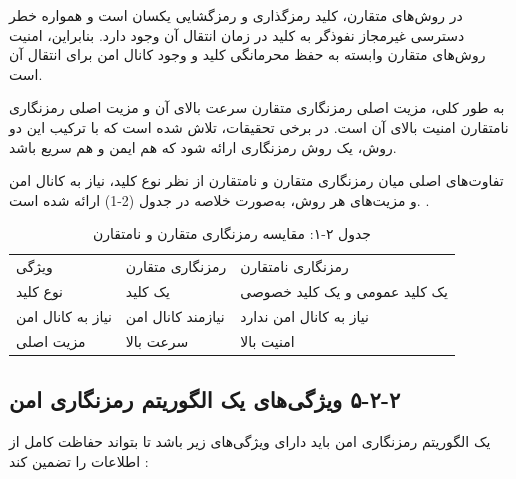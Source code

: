 در روش‌های متقارن، کلید رمزگذاری و رمزگشایی یکسان است و همواره خطر دسترسی غیرمجاز نفوذگر به کلید در زمان انتقال آن وجود دارد. بنابراین، امنیت روش‌های متقارن وابسته به حفظ محرمانگی کلید و وجود کانال امن برای انتقال آن است.

به طور کلی، مزیت اصلی رمزنگاری متقارن سرعت بالای آن و مزیت اصلی رمزنگاری نامتقارن امنیت بالای آن است. در برخی تحقیقات، تلاش شده است که با ترکیب این دو روش، یک روش رمزنگاری ارائه شود که هم ایمن و هم سریع باشد\cite{ref29}.

تفاوت‌های اصلی میان رمزنگاری متقارن و نامتقارن از نظر نوع کلید، نیاز به کانال امن و مزیت‌های هر روش، به‌صورت خلاصه در جدول (2-1) ارائه شده است. \cite{ref30}.

\begin{table}[h]
\centering
\small
\begin{tabular}{lll}
\hline
ویژگی & رمزنگاری متقارن & رمزنگاری نامتقارن \\
نوع کلید & یک کلید & یک کلید عمومی و یک کلید خصوصی \\
نیاز به کانال امن & نیازمند کانال امن & نیاز به کانال امن ندارد \\
مزیت اصلی & سرعت بالا & امنیت بالا \\
\hline
\end{tabular}
\caption{جدول ‏۲‏-‏۱‏: مقایسه رمزنگاری متقارن و نامتقارن}
\end{table}

\subsection{‏۲‏-‏۲‏-‏۵‏ ویژگی‌های یک الگوریتم رمزنگاری امن}

یک الگوریتم رمزنگاری امن باید دارای ویژگی‌های زیر باشد تا بتواند حفاظت کامل از اطلاعات را تضمین کند \cite{ref31}:

